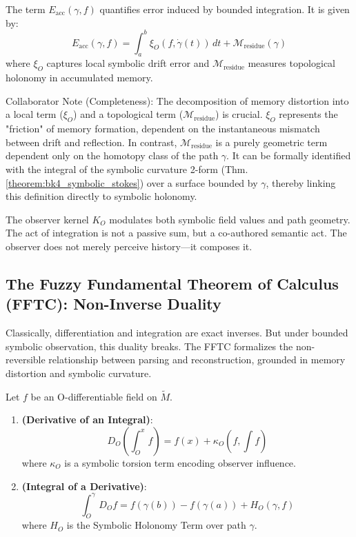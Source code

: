 \begin{definition}
\label{definition:bk4_symbolic_memory_distortion}
The term $E_{\text{acc}}(\gamma, f)$ quantifies error induced by bounded integration. It is given by:
\[
E_{\text{acc}}(\gamma, f) = \int_a^b \xi_O(f, \dot{\gamma}(t)) \, dt + \mathcal{M}_{\text{residue}}(\gamma)
\]
where $\xi_O$ captures local symbolic drift error and $\mathcal{M}_{\text{residue}}$ measures topological holonomy in accumulated memory.
\end{definition}

\begin{remark}
    Collaborator Note (Completeness): The decomposition of memory distortion into a local term ($\xi_O$) and a topological term ($\mathcal{M}_{\text{residue}}$) is crucial. $\xi_O$ represents the "friction" of memory formation, dependent on the instantaneous mismatch between drift and reflection. In contrast, $\mathcal{M}_{\text{residue}}$ is a purely geometric term dependent only on the homotopy class of the path $\gamma$. It can be formally identified with the integral of the symbolic curvature 2-form (Thm. \ref{theorem:bk4_symbolic_stokes}) over a surface bounded by $\gamma$, thereby linking this definition directly to symbolic holonomy.
\end{remark}

\begin{scholium}
\label{schlium:bk4_the_observer_as_weaver}
The observer kernel $K_O$ modulates both symbolic field values and path geometry. The act of integration is not a passive sum, but a co-authored semantic act. The observer does not merely perceive history—it composes it.
\end{scholium}

\subsection{The Fuzzy Fundamental Theorem of Calculus (FFTC): Non-Inverse Duality}
\label{subsec:bk4_fuzzy_calculus_theorem}

Classically, differentiation and integration are exact inverses. But under bounded symbolic observation, this duality breaks. The FFTC formalizes the non-reversible relationship between parsing and reconstruction, grounded in memory distortion and symbolic curvature.

\begin{theorem}
\label{theorem:bk4_fuzzy_fundamental}
Let $f$ be an O-differentiable field on $\tilde{M}$.
\begin{enumerate}
    \item \textbf{(Derivative of an Integral)}:
    \[
    D_O \left( \int_O^x f \right) = f(x) + \kappa_O\left(f, \int f\right)
    \]
    where $\kappa_O$ is a symbolic torsion term encoding observer influence.
    
    \item \textbf{(Integral of a Derivative)}:
    \[
    \int_O^\gamma D_O f = f(\gamma(b)) - f(\gamma(a)) + H_O(\gamma, f)
    \]
    where $H_O$ is the Symbolic Holonomy Term over path $\gamma$.
\end{enumerate}
\end{theorem}

